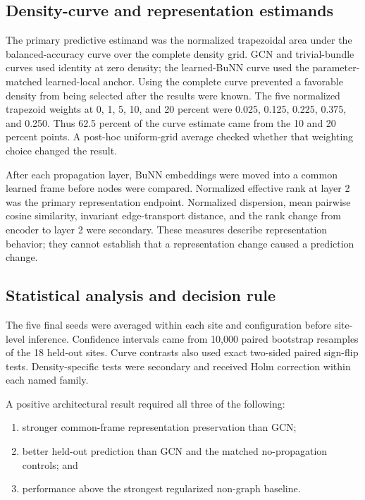 \documentclass[11pt,a4paper]{article}
\begin{document}


\subsection{Density-curve and representation estimands}

The primary predictive estimand was the normalized trapezoidal area under the
balanced-accuracy curve over the complete density grid. GCN and trivial-bundle
curves used identity at zero density; the learned-BuNN curve used the
parameter-matched learned-local anchor. Using the complete curve prevented a
favorable density from being selected after the results were known. The five
normalized trapezoid weights at 0, 1, 5, 10, and 20 percent were 0.025, 0.125,
0.225, 0.375, and 0.250. Thus 62.5 percent of the curve estimate came from the
10 and 20 percent points. A post-hoc uniform-grid average checked whether that
weighting choice changed the result.

After each propagation layer, BuNN embeddings were moved into a common learned
frame before nodes were compared. Normalized effective rank at layer 2 was the
primary representation endpoint. Normalized dispersion, mean pairwise cosine
similarity, invariant edge-transport distance, and the rank change from encoder
to layer 2 were secondary. These measures describe representation behavior;
they cannot establish that a representation change caused a prediction change.

\subsection{Statistical analysis and decision rule}

The five final seeds were averaged within each site and configuration before
site-level inference. Confidence intervals came from 10,000 paired bootstrap
resamples of the 18 held-out sites. Curve contrasts also used exact two-sided
paired sign-flip tests. Density-specific tests were secondary and received
Holm correction within each named family.

A positive architectural result required all three of the following:
\begin{enumerate}
  \item stronger common-frame representation preservation than GCN;
  \item better held-out prediction than GCN and the matched no-propagation
  controls; and
  \item performance above the strongest regularized non-graph baseline.
\end{enumerate}
\end{document}
